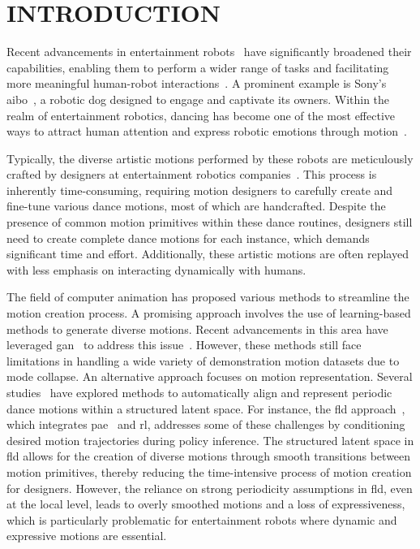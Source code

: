 \section{INTRODUCTION}
Recent advancements in entertainment robots~\cite{aibo,lovot, disney_learning} have significantly broadened their capabilities, enabling them to perform a wider range of tasks and facilitating more meaningful human-robot interactions~\cite{KANG2020207, companionAIBO2003, robinson2013psychosocial}.
A prominent example is Sony's aibo~\cite{aibo}, a robotic dog designed to engage and captivate its owners.
Within the realm of entertainment robotics, dancing has become one of the most effective ways to attract human attention and express robotic emotions through motion~\cite{dance_robot_god,boston_dynamics_dance,anymal_dance}. 

Typically, the diverse artistic motions performed by these robots are meticulously crafted by designers at entertainment robotics companies~\cite{aibo_dance, disney_learning}.
This process is inherently time-consuming, requiring motion designers to carefully create and fine-tune various dance motions, most of which are handcrafted.
Despite the presence of common motion primitives within these dance routines, designers still need to create complete dance motions for each instance, which demands significant time and effort.
Additionally, these artistic motions are often replayed with less emphasis on interacting dynamically with humans.

The field of computer animation has proposed various methods to streamline the motion creation process.
A promising approach involves the use of learning-based methods to generate diverse motions.
Recent advancements in this area have leveraged \ac{gan}~\cite{goodfellow2020generative} to address this issue~\cite{amp_org,amp_quadruped_robot,li2023learning,peng2022ase,li2023versatile,luo2023perpetual,tessler2023calm}.
However, these methods still face limitations in handling a wide variety of demonstration motion datasets due to mode collapse.
An alternative approach focuses on motion representation.
Several studies~\cite{periodic_autoencoder, ai_choreographer, transflower, fld} have explored methods to automatically align and represent periodic dance motions within a structured latent space. 
For instance, the \ac{fld} approach~\cite{fld}, which integrates \ac{pae}~\cite{periodic_autoencoder} and \ac{rl}, addresses some of these challenges by conditioning desired motion trajectories during policy inference.
The structured latent space in \ac{fld} allows for the creation of diverse motions through smooth transitions between motion primitives, thereby reducing the time-intensive process of motion creation for designers.
However, the reliance on strong periodicity assumptions in \ac{fld}, even at the local level, leads to overly smoothed motions and a loss of expressiveness, which is particularly problematic for entertainment robots where dynamic and expressive motions are essential.

